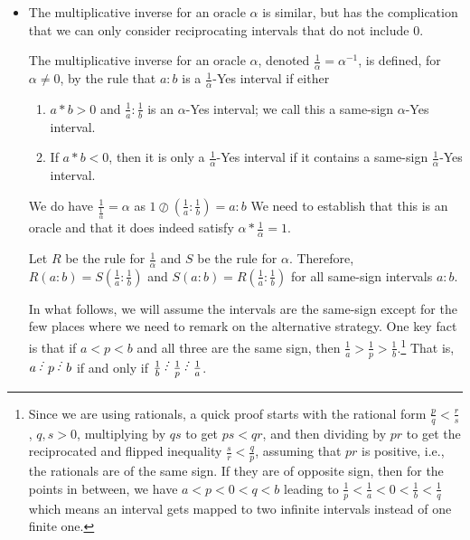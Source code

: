 \documentclass[12pt]{article}
\begin{document}
\begin{itemize}
    \item The multiplicative inverse for an oracle $\alpha$ is similar, but has the complication that we can only consider reciprocating intervals that do not include 0. 
    
    The multiplicative inverse for an oracle $\alpha$, denoted $\frac{1}{\alpha} = \alpha^{-1}$, is defined, for $\alpha \neq 0$, by the rule that $a:b$ is a $\frac{1}{\alpha}$-Yes interval if either 
    
    \begin{enumerate}
        \item  $a*b > 0$  and $\frac{1}{a}:\frac{1}{b}$ is an $\alpha$-Yes interval; we call this a same-sign $\alpha$-Yes interval.
        \item If $a*b<0$, then it is only a $\frac{1}{\alpha}$-Yes interval if it contains a same-sign $\frac{1}{\alpha}$-Yes interval. 
    \end{enumerate}
    
    We do have $\frac{1}{\frac{1}{\alpha}} = \alpha$ as $1\oslash (\frac{1}{a}: \frac{1}{b}) = a:b$ We need to establish that this is an oracle and that it does indeed satisfy $\alpha * \frac{1}{\alpha} = 1$.
    
     Let $R$ be the rule for $\frac{1}{\alpha}$ and $S$ be the rule for $\alpha$. Therefore, $R(a:b)=S(\frac{1}{a}:\frac{1}{b})$ and $S(a:b) = R(\frac{1}{a}:\frac{1}{b})$ for all same-sign intervals $a:b$.
    
    In what follows, we will assume the intervals are the same-sign except for the few places where we need to remark on the alternative strategy. One key fact is that if $a<p<b$ and all three are the same sign, then $\frac{1}{a} > \frac{1}{p} > \frac{1}{b}$.\footnote{Since we are using rationals, a quick proof starts with the rational form $\frac{p}{q} < \frac{r}{s}$, $q, s > 0$, multiplying by $qs$ to get $ps < qr$, and then dividing by $pr$ to get the reciprocated and flipped inequality $\frac{s}{r} < \frac{q}{p}$, assuming that $pr$ is positive, i.e., the rationals are of the same sign. If they are of opposite sign, then for the points in between, we have $a < p < 0< q< b$ leading to $\frac{1}{p} < \frac{1}{a} < 0 < \frac{1}{b} < \frac{1}{q}$ which means an interval gets mapped to two infinite intervals instead of one finite one.} That is, $a\lte p\lte b$ if and only if $\frac{1}{b} \lte \frac{1}{p}\lte \frac{1}{a}$.
    

\end{itemize}
\end{document}
